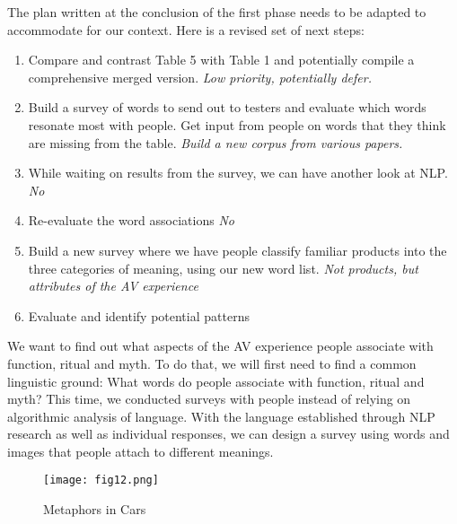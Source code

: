 \documentclass[12pt, usenames, dvipsnames]{report}
\begin{document}
\begin{flushleft}
The plan written at the conclusion of the first phase needs to be adapted to accommodate for our context.
Here is a revised set of next steps:

\begin{enumerate}
	\item Compare and contrast Table 5 with Table 1 and potentially compile a comprehensive merged version. \emph{Low priority, potentially defer.}
	\item Build a survey of words to send out to testers and evaluate which words resonate most with people. Get input from people on words that they think are missing from the table. \emph{Build a new corpus from various papers.}
	\item While waiting on results from the survey, we can have another look at NLP. \emph{No}
	\item Re-evaluate the word associations \emph{No}
	\item Build a new survey where we have people classify familiar products into the three categories of meaning, using our new word list. \emph{Not products, but attributes of the AV experience}
	\item Evaluate and identify potential patterns
\end{enumerate}

We want to find out what aspects of the AV experience people associate with function, ritual and myth. 
To do that, we will first need to find a common linguistic ground:
What words do people associate with function, ritual and myth?
This time, we conducted surveys with people instead of relying on algorithmic analysis of language. 
With the language established through NLP research as well as individual responses, we can design a survey using words and images that people attach to different meanings.

\vspace*{1.2em}
\begin{figure}[!htbp]
  \hspace*{-3.666em}
  \texttt{[image: fig12.png]}
  \caption{Metaphors in Cars}
  \label{fig:figure12}
\end{figure}
\vspace*{1.2em}


\end{flushleft}
\end{document}

